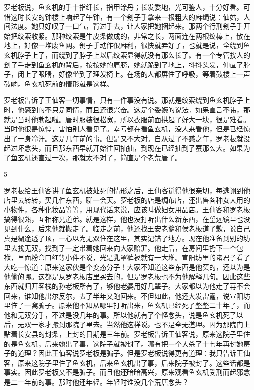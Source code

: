 罗老板说，鱼玄机的手十指纤长，指甲涂丹；长发委地，光可鉴人，十分好看。可惜这时长安的钟楼上响起了午钟，有一个刽子手拿来一根粗大的麻绳说：仙姑，人间法度。她只好叹了一口气，背过手去，让人家把她捆起来。那两个行刑刽子手开始把绞索收紧。那种绞索是牛皮条做成的，非常之长，两面连在两根绞棒上，散在地上，好像一堆废鱼网。刽子手动作很麻利，很快就弄好了，也就是说，全绕到鱼玄机脖子上了，而绕到了脖子上以后绞索显得就没有那么长了。有一个专管按人的刽子手走到鱼玄机的背后，按按她的肩膀，她就跪到了地上，抖抖头发，伸直了脖子，闭上了眼睛，好像坐到了理发椅上。在场的人都屏住了呼吸，等着鼓楼上一声鼓响。鱼玄机死前的情形就是这样。 

罗老板告诉了王仙客一切事情，只有一件事没有说。那就是绞索绕到鱼玄机脖子上时，他感到的不只是同情，而且还很兴奋。这是个委婉的说法，如果直言不讳，那就是当时他勃起啦。唐时服装很松宽，所以衣服前面拱起了好大一块，很是难看。当时他很是惊惶，害怕别人看见了。幸亏都在看鱼玄机，没人来看他，但是已经惊出了一身冷汗。这是几年前的事。但是又不大对。自从过了不惑之年，罗老板就没起过坏念头，而且那东西早就开始往回抽抽，到现在已经抽到了蚕那么大。如果为了鱼玄机还直过一次，那就太不对了，简直是个老荒唐了。 

5 

罗老板给王仙客讲了鱼玄机被处死的情形之后，王仙客觉得他很亲切，每逃诩到他店里去转转，买几件东西，聊一会天。罗老板的店是绸布店，还出售各种女人用的小物件，各种化妆品等等，用现代话来说，应该叫做妇女用品店。王仙客和罗老板搞得很熟，互相称兄道弟。就是这样，他也没打听出什么新东西，在望远镜里也没见到什么，后来他就搬走了。临走之前，他还找王安老爹和侯老板道了歉，说自己真是糊途透了顶，一心以为无双住在这里，其实记错了地方。现在他准备到别的坊里去找无双，找到了一定带着她回来向大家赔罪。他走后，在房间里扔下一个包袱，里面粉盒口红等小件不说，光是乳罩裤衩就有一大堆。宣阳坊里的诸君子看了大吃一惊道：原来这家伙是个变态分子！大家不知道这些东西是他买的，还以为是他偷的哪。这都是从罗老板店里买去的，但是罗老板也不为他解释几句。因此这些东西就归开客栈的孙老板所有了，够他老婆用好几辈子。大家都以为他走了再不会回来，谁知他出尔反尔，去了半年又跑回来。不但如此，他还大发雷霆，说宣阳坊里住了一窝骗子。原来他不知从哪里打听出来，鱼玄机已经死了整整二十年了，而他和无双分手，不过是没几年的事。所以他就有了个怪念头，说是鱼玄机死了以后，无双一家才搬到那院子里去。当然他这样说，也不是全无道理。因为那院门上贴着长安县的封条，上封的日期是三年前。罗老板告诉王仙客说，原来这院子里住的是鱼玄机，后来她出了事，这院子就被封了。哪有把一个人杀了十七年再封她房子的道理？因此王仙客说罗老板是骗子。但是罗老板说得更有道理：我只告诉王仙客，原来这院子里住了鱼玄机，后来鱼玄机出了事，后来院子被封了。这些话都是事实。因此罗老板又不是骗子。而且他还暗暗高兴，原来观看鱼玄机受刑而起邪念是二十年前的事。那时他还年轻。年轻时谁没几个荒唐念头？ 

